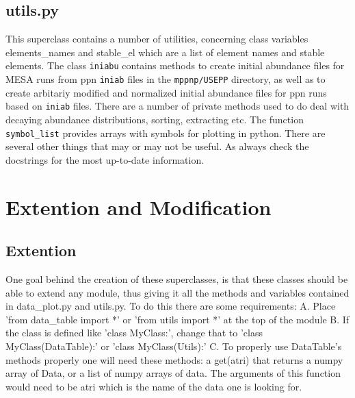 \subsection{utils.py}
This superclass contains a number of utilities, concerning class
variables elements\_names and stable\_el which are a list of element
names and stable elements. The class \texttt{iniabu} contains methods
to create initial abundance files for MESA runs from ppn
\texttt{iniab} files in the \texttt{mppnp/USEPP} directory, as well as
to create arbitariy modified and normalized initial abundance files
for ppn runs based on \texttt{iniab} files. There are a number of
private methods used to do deal with decaying abundance distributions,
sorting, extracting etc. The function \texttt{symbol\_list} provides
arrays with symbols for plotting in python. There are several other
things that may or may not be useful. As always check the docstrings
for the most up-to-date information.

\section{Extention and Modification}

\subsection{Extention}

One goal behind the creation of these superclasses, is that these classes should be able to extend any module, thus giving it all the methods and variables contained in 
data\_plot.py and utils.py.  To do this there are some requirements:\newline
A. Place 'from data\_table import *' or 'from utils import *' at the top of the module\newline
B. If the class is defined like 'class MyClass:', change that to 
   'class MyClass(DataTable):' or 'class MyClass(Utils):'\newline
C. To properly use DataTable's methods properly one will need these methods:
	a get(atri) that returns a numpy array of Data, or a 
	list of numpy arrays of data.  The arguments of this function would need to be
	atri which is the name of the data one is looking for.\newline\newline

